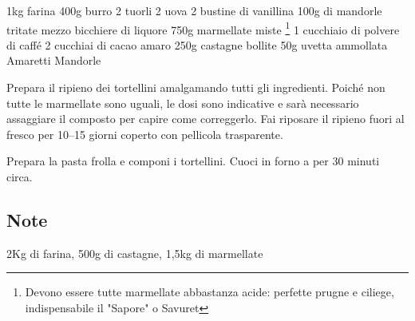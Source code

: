 \begin{ingreds}
	1kg farina 
	400g burro 
	2 tuorli
	2 uova 
	2 bustine di vanillina
	100g di mandorle tritate 
	mezzo bicchiere di liquore
\columnbreak
	750g marmellate miste  \footnote{Devono essere tutte marmellate abbastanza acide: perfette prugne e ciliege, indispensabile il "Sapore" o Savuret}
	1 cucchiaio di polvere di caffé 
	2 cucchiai di cacao amaro 
	250g castagne bollite 
	50g uvetta ammollata 
	Amaretti 
	Mandorle 



\end{ingreds}

\begin{method}
Prepara il ripieno dei tortellini amalgamando tutti gli ingredienti. Poiché non tutte le marmellate sono uguali, le dosi sono indicative e sarà necessario assaggiare il composto per capire come correggerlo. Fai riposare il ripieno fuori al fresco per 10--15 giorni coperto con pellicola trasparente.

	Prepara la pasta frolla e componi i tortellini. Cuoci in forno a  per 30 minuti circa.
	
\subsection*{Note}

2Kg di farina, 500g di castagne, 1,5kg di marmellate


\end{method}




